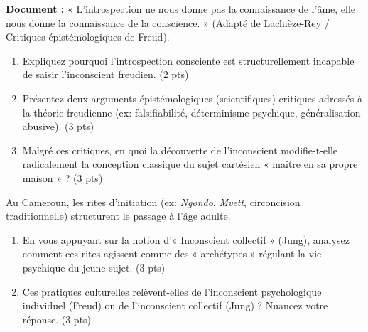 \documentclass[11pt]{article}
\begin{document}
\begin{exercice}
\textbf{Document :} « L'introspection ne nous donne pas la connaissance de l'âme, elle nous donne la connaissance de la conscience. » (Adapté de Lachièze-Rey / Critiques épistémologiques de Freud).

\begin{enumerate}
    \item Expliquez pourquoi l'introspection consciente est structurellement incapable de saisir l'inconscient freudien. (2 pts)
    \item Présentez deux arguments épistémologiques (scientifiques) critiques adressés à la théorie freudienne (ex: falsifiabilité, déterminisme psychique, généralisation abusive). (3 pts)
    \item Malgré ces critiques, en quoi la découverte de l'inconscient modifie-t-elle radicalement la conception classique du sujet cartésien « maître en sa propre maison » ? (3 pts)
\end{enumerate}
\end{exercice}

\begin{exercice}
Au Cameroun, les rites d'initiation (ex: \textit{Ngondo}, \textit{Mvett}, circoncision traditionnelle) structurent le passage à l'âge adulte.

\begin{enumerate}
    \item En vous appuyant sur la notion d'« Inconscient collectif » (Jung), analysez comment ces rites agissent comme des « archétypes » régulant la vie psychique du jeune sujet. (3 pts)
    \item Ces pratiques culturelles relèvent-elles de l'inconscient psychologique individuel (Freud) ou de l'inconscient collectif (Jung) ? Nuancez votre réponse. (3 pts)
\end{enumerate}
\end{exercice}
\end{document}
